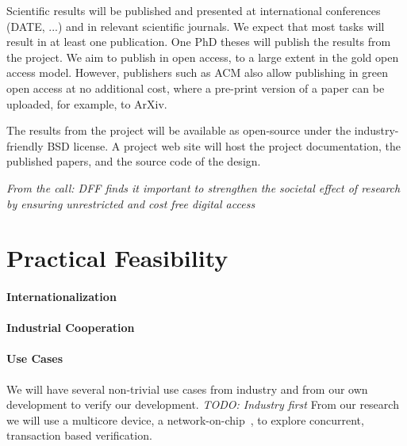 \documentclass[fleqn,12pt]{article}
\newcommand{\todo}[1]{{\it TODO: #1}}
\begin{document}
Scientific results will be published and presented at international
conferences (DATE, ...) and in relevant scientific journals.
We expect that most tasks will result in at least one publication.
One PhD theses will publish the results from the project.
We aim to publish in open access, to a large extent in the gold open access model.
However, publishers such as ACM also allow publishing in green open access
at no additional cost, where a pre-print version of a paper can be uploaded,
for example, to ArXiv.

The results from the project will be available as open-source under the
industry-friendly BSD license.
A project web site will host the project documentation, the published papers, and the
source code of the design.

\emph{From the call: DFF finds it important to strengthen the societal effect of research by ensuring unrestricted and cost free digital access}



\section{Practical Feasibility}


\paragraph*{Internationalization}



\paragraph*{Industrial Cooperation}


\paragraph*{Use Cases}

We will have several non-trivial use cases from industry and from our own development to verify
our development. \todo{Industry first}
From our research we will use a multicore device, a network-on-chip~\cite{s4noc:nocarc2019},
to explore concurrent, transaction based verification.
\end{document}
